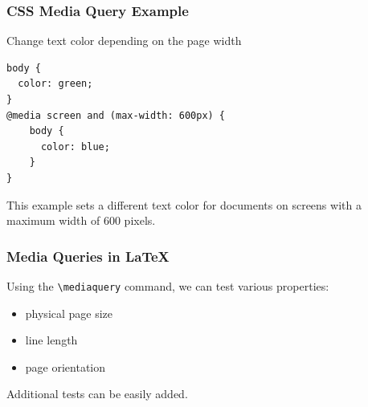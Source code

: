




\begin{frame}[fragile]
\frametitle{CSS Media Query Example}
\begin{example}{Change text color depending on the page width}
\begin{verbatim}
body {
  color: green;
}
@media screen and (max-width: 600px) {
    body {
      color: blue;
    }
}
\end{verbatim}
\end{example}
\end{frame}

This example sets a different text color for documents on screens with a maximum width of 600 pixels.


          
\begin{frame}[fragile]
  \frametitle{Media Queries in \LaTeX}
    Using the \verb|\mediaquery| command, we can test various properties:
  
    \begin{itemize}
  \item physical page size
  \item line length
  \item page orientation
\end{itemize}

Additional tests can be easily added.

\end{frame}


